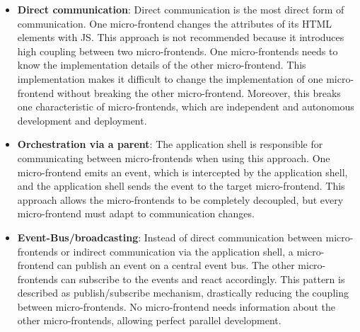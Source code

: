\begin{itemize}
    \item \textbf{Direct communication}: Direct communication is the most direct form of communication. One micro-frontend changes the attributes of its \ac{HTML} elements with \ac{JS}. This approach is not recommended because it introduces high coupling between two micro-frontends. One micro-frontends needs to know the implementation details of the other micro-frontend. This implementation makes it difficult to change the implementation of one micro-frontend without breaking the other micro-frontend. Moreover, this breaks one characteristic of micro-frontends, which are independent and autonomous development and deployment.
    \item \textbf{Orchestration via a parent}: The application shell is responsible for communicating between micro-frontends when using this approach. One micro-frontend emits an event, which is intercepted by the application shell, and the application shell sends the event to the target micro-frontend. This approach allows the micro-frontends to be completely decoupled, but every micro-frontend must adapt to communication changes.
    \item \textbf{Event-Bus/broadcasting}: Instead of direct communication between micro-frontends or indirect communication via the application shell, a micro-frontend can publish an event on a central event bus. The other micro-frontends can subscribe to the events and react accordingly. This pattern is described as publish/subscribe mechanism, drastically reducing the coupling between micro-frontends. No micro-frontend needs information about the other micro-frontends, allowing perfect parallel development.
\end{itemize}
